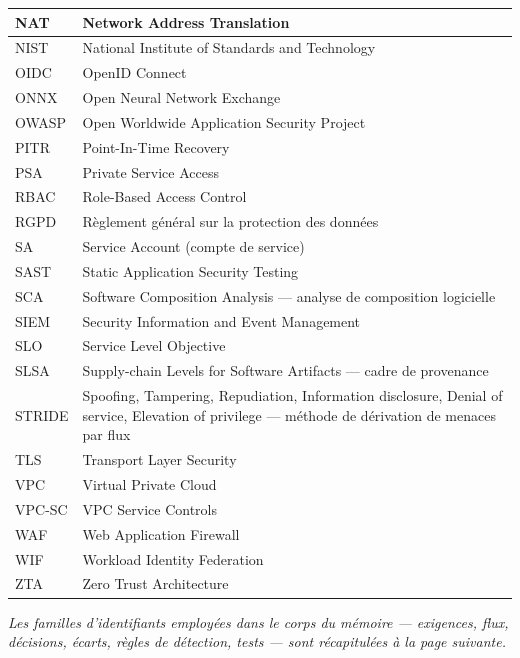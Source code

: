 \begin{longtable}{|P{3cm}|P{12.4cm}|}
NAT & Network Address Translation \\ \hline
NIST & National Institute of Standards and Technology \\ \hline
OIDC & OpenID Connect \\ \hline
ONNX & Open Neural Network Exchange \\ \hline
OWASP & Open Worldwide Application Security Project \\ \hline
PITR & Point-In-Time Recovery \\ \hline
PSA & Private Service Access \\ \hline
RBAC & Role-Based Access Control \\ \hline
RGPD & Règlement général sur la protection des données \\ \hline
SA & Service Account (compte de service) \\ \hline
SAST & Static Application Security Testing \\ \hline
SCA & Software Composition Analysis --- analyse de composition logicielle \\ \hline
SIEM & Security Information and Event Management \\ \hline
SLO & Service Level Objective \\ \hline
SLSA & Supply-chain Levels for Software Artifacts --- cadre de provenance \\ \hline
STRIDE & Spoofing, Tampering, Repudiation, Information disclosure, Denial of service, Elevation of privilege --- méthode de dérivation de menaces par flux \\ \hline
TLS & Transport Layer Security \\ \hline
VPC & Virtual Private Cloud \\ \hline
VPC-SC & VPC Service Controls \\ \hline
WAF & Web Application Firewall \\ \hline
WIF & Workload Identity Federation \\ \hline
ZTA & Zero Trust Architecture \\
\hline
\end{longtable}
\addtocounter{table}{-1}

\textit{Les familles d'identifiants employées dans le corps du mémoire --- exigences, flux,
décisions, écarts, règles de détection, tests --- sont récapitulées à la page suivante.}

